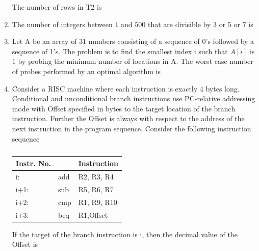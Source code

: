 \documentclass[a4paper, 11pt]{article}
\begin{document}
\begin{enumerate}
    The number of rows in T2 is \underline{\hspace{2cm}}

    \hfill{}
    
    \item The number of integers between $1$ and $500$  that are divisible by $3$ or $5$ or $7$ is \underline{\hspace{2cm}}
    
    \hfill{}
    
    \item Let A be an array of $31$ numbers consisting of a sequence of 0's followed by a sequence of 1's. The problem is to find the smallest index i such that $A[i]$ is $1$ by probing the minimum number of locations in A. The worst case number of probes performed by an optimal algorithm is \underline{\hspace{2cm}}
    
    \hfill{}
    
    \item Consider a RISC machine where each instruction is exactly $4$ bytes long. Conditional and unconditional branch instructions use PC-relative addressing mode with Offset specified in bytes to the target location of the branch instruction. Further the Offset is always with respect to the address of the next instruction in the program sequence. Consider the following instruction sequence
    
    \begin{table}[h!]
        \centering
        \begin{tabular}{|l|l|l|}
            \hline
            Instr. No. & & Instruction \\
            \hline
            i: & add & R2, R3, R4 \\
            i+1: & sub & R5, R6, R7 \\
            i+2: & cmp & R1, R9, R10 \\
            i+3: & beq & R1,Offset  \\
            \hline
        \end{tabular}
        \caption*{}
        \label{tab:49}
    \end{table}

    If the target of the branch instruction is i, then the decimal value of the Offset is \underline{\hspace{2cm}}
    

\end{enumerate}
\end{document}
